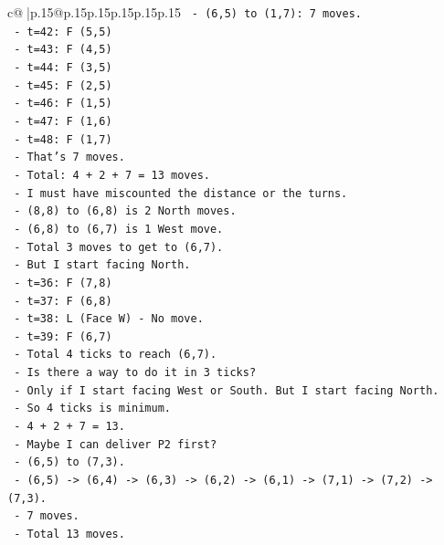 \documentclass{article}
\begin{document}
{\begin{supertabular}{c@{$\;$}|p{.15\linewidth}@{}p{.15\linewidth}p{.15\linewidth}p{.15\linewidth}p{.15\linewidth}p{.15\linewidth}}
{{{\texttt{        {-} (6,5) to (1,7): 7 moves.} \\
\texttt{          {-} t=42: F (5,5)} \\
\texttt{          {-} t=43: F (4,5)} \\
\texttt{          {-} t=44: F (3,5)} \\
\texttt{          {-} t=45: F (2,5)} \\
\texttt{          {-} t=46: F (1,5)} \\
\texttt{          {-} t=47: F (1,6)} \\
\texttt{          {-} t=48: F (1,7)} \\
\texttt{          {-} That's 7 moves.} \\
\texttt{        {-} Total: 4 + 2 + 7 = 13 moves.} \\
\texttt{        {-} I must have miscounted the distance or the turns.} \\
\texttt{        {-} (8,8) to (6,8) is 2 North moves.} \\
\texttt{        {-} (6,8) to (6,7) is 1 West move.} \\
\texttt{        {-} Total 3 moves to get to (6,7).} \\
\texttt{        {-} But I start facing North.} \\
\texttt{        {-} t=36: F (7,8)} \\
\texttt{        {-} t=37: F (6,8)} \\
\texttt{        {-} t=38: L (Face W) {-} No move.} \\
\texttt{        {-} t=39: F (6,7)} \\
\texttt{        {-} Total 4 ticks to reach (6,7).} \\
\texttt{        {-} Is there a way to do it in 3 ticks?} \\
\texttt{        {-} Only if I start facing West or South. But I start facing North.} \\
\texttt{        {-} So 4 ticks is minimum.} \\
\texttt{        {-} 4 + 2 + 7 = 13.} \\
\texttt{        {-} Maybe I can deliver P2 first?} \\
\texttt{        {-} (6,5) to (7,3).} \\
\texttt{        {-} (6,5) {-}> (6,4) {-}> (6,3) {-}> (6,2) {-}> (6,1) {-}> (7,1) {-}> (7,2) {-}> (7,3).} \\
\texttt{        {-} 7 moves.} \\
\texttt{        {-} Total 13 moves.} \\
}}}
\end{supertabular}}
\end{document}
